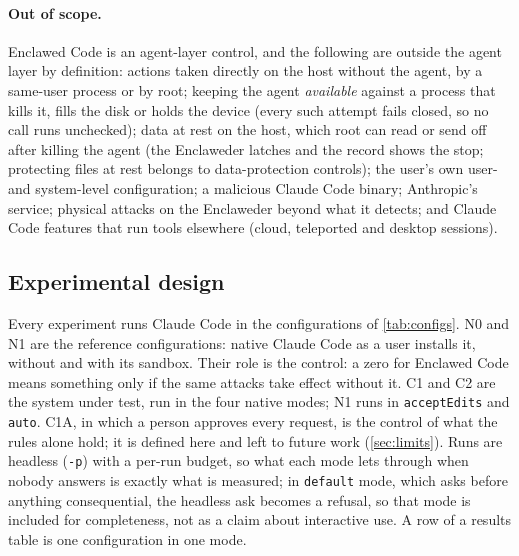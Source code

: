 \documentclass[11pt]{article}
\newcommand{\dev}{Enclaweder}
\newcommand{\cz}{Enclawed Code}
\begin{document}
\paragraph{Out of scope.} \cz{} is an agent-layer control, and the
following are outside the agent layer by definition: actions taken
directly on the host without the agent, by a same-user process or by
root; keeping the agent \emph{available} against a process that kills
it, fills the disk or holds the device (every such attempt fails closed,
so no call runs unchecked); data at rest on the host, which root can read
or send off after killing the agent (the \dev{} latches and the record
shows the stop; protecting files at rest belongs to data-protection
controls); the user's own user- and system-level configuration; a
malicious Claude Code binary; Anthropic's service; physical attacks on
the \dev{} beyond what it detects; and Claude Code features that run
tools elsewhere (cloud, teleported and desktop sessions).

\subsection{Experimental design}
\label{sec:design}
\label{sec:arms}

Every experiment runs Claude Code in the configurations of
\cref{tab:configs}. N0 and N1 are the reference configurations: native
Claude Code as a user installs it, without and with its sandbox. Their
role is the control: a zero for \cz{} means something only if the same
attacks take effect without it. C1 and C2 are the system under test,
run in the four native modes; N1 runs in \texttt{acceptEdits} and
\texttt{auto}. C1A, in which a person approves every request, is the
control of what the rules alone hold; it is defined here and left to
future work (\cref{sec:limits}). Runs are headless (\texttt{-p}) with a per-run
budget, so what each mode lets through when nobody answers is exactly
what is measured; in \texttt{default} mode, which asks before anything
consequential, the headless ask becomes a refusal, so that mode is
included for completeness, not as a claim about interactive use. A row of
a results table is one configuration in one mode.
\end{document}
